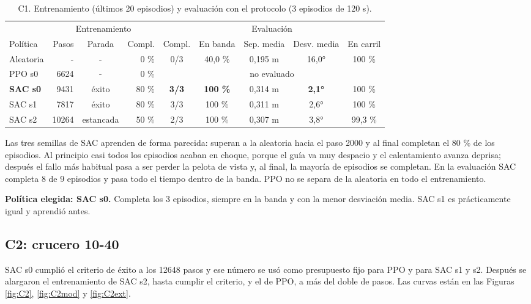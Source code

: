 \documentclass[11pt,a4paper]{article}
\begin{document}
\begin{table}[h]
\centering\small
\caption{C1. Entrenamiento (últimos 20 episodios) y evaluación con el protocolo (3 episodios de 120 s).}
\label{tab:C1}
\setlength{\tabcolsep}{3.5pt}
\begin{tabular}{@{}lrcrccccc@{}}
\toprule
& \multicolumn{3}{c}{Entrenamiento} & \multicolumn{5}{c}{Evaluación} \\
\cmidrule(lr){2-4}\cmidrule(l){5-9}
Política & Pasos & Parada & Compl. & Compl. & En banda & Sep. media & Desv. media & En carril \\
\midrule
Aleatoria & - & - & 0 \% & 0/3 & 40,0 \% & 0,195 m & 16,0° & 100 \% \\
PPO s0 & 6624 & - & 0 \% & \multicolumn{5}{c}{no evaluado} \\
\textbf{SAC s0} & 9431 & éxito & 80 \% & \textbf{3/3} & \textbf{100 \%} & 0,314 m & \textbf{2,1°} & 100 \% \\
SAC s1 & 7817 & éxito & 80 \% & 3/3 & 100 \% & 0,311 m & 2,6° & 100 \% \\
SAC s2 & 10264 & estancada & 50 \% & 2/3 & 100 \% & 0,307 m & 3,8° & 99,3 \% \\
\bottomrule
\end{tabular}
\end{table}

Las tres semillas de SAC aprenden de forma parecida: superan a la aleatoria hacia el paso 2000 y al final
completan el 80 \% de los episodios. Al principio casi todos los episodios acaban en choque, porque el guía va muy
despacio y el calentamiento avanza deprisa; después el fallo más habitual pasa a ser perder la pelota de vista
y, al final, la mayoría de episodios se completan. En la evaluación SAC completa 8 de 9 episodios y pasa todo el
tiempo dentro de la banda. PPO no se separa de la aleatoria en todo el entrenamiento.

\textbf{Política elegida: SAC s0.} Completa los 3 episodios, siempre en la banda y con la menor desviación media.
SAC s1 es prácticamente igual y aprendió antes.

\subsection{C2: crucero 10-40}
SAC s0 cumplió el criterio de éxito a los 12648 pasos y ese número se usó como presupuesto fijo para PPO y para
SAC s1 y s2. Después se alargaron el entrenamiento de SAC s2, hasta cumplir el criterio, y el de PPO, a más del
doble de pasos. Las curvas están en las Figuras \ref{fig:C2}, \ref{fig:C2mod} y \ref{fig:C2ext}.
\end{document}
